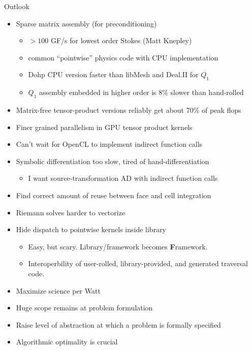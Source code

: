 \documentclass{beamer}
\begin{document}
\begin{frame}{Outlook}
  \begin{itemize}
  \item Sparse matrix assembly (for preconditioning)
    \begin{itemize}
    \item $> 100$ GF/s for lowest order Stokes (Matt Knepley)
    \item common ``pointwise'' physics code with CPU implementation
    \item Dohp CPU version faster than libMesh and Deal.II for $Q_1$
    \item $Q_1$ assembly embedded in higher order is 8\% slower than hand-rolled
    \end{itemize}
  \item Matrix-free tensor-product versions reliably get about 70\% of peak flops
  \item Finer grained parallelism in GPU tensor product kernels
  \item Can't wait for OpenCL to implement indirect function calls
  \item Symbolic differentiation too slow, tired of hand-differentiation
    \begin{itemize}
    \item I want source-transformation AD with indirect function calls
    \end{itemize}
  \item Find correct amount of reuse between face and cell integration
  \item Riemann solves harder to vectorize
  \item Hide dispatch to pointwise kernels inside library
    \begin{itemize}
    \item Easy, but scary. Library/framework becomes \alert{\bf F}ramework.
    \item Interoperbility of user-rolled, library-provided, and generated traversal code.
    \end{itemize}
  \end{itemize}
\end{frame}

\begin{frame}\LARGE
  \begin{itemize}
  \item Maximize science per Watt
  \item Huge scope remains at problem formulation
  \item Raise level of abstraction at which a problem is formally specified
  \item Algorithmic optimality is crucial
  \end{itemize}
\end{frame}
\end{document}
